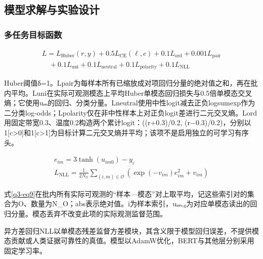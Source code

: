\hypertarget{q3-ux6a21ux578bux6c42ux89e3ux4e0eux5b9eux9a8cux8bbeux8ba1}{%
\subsection{模型求解与实验设计}\label{q3-ux6a21ux578bux6c42ux89e3ux4e0eux5b9eux9a8cux8bbeux8ba1}}

\hypertarget{q3-ux591aux4efbux52a1ux76eeux6807ux51fdux6570}{%
\subsubsection{多任务目标函数}\label{q3-ux591aux4efbux52a1ux76eeux6807ux51fdux6570}}

\begin{equation}
\begin{gathered}L=L_{\mathrm{Huber}}(r,y)+0.5L_{\mathrm{CE}}(\ell,c)+0.1L_{\mathrm{ord}}+0.001L_{\mathrm{pair}} \\ \quad+0.1L_{\mathrm{uni}}+0.1L_{\mathrm{neutral}}+0.1L_{\mathrm{polarity}}+0.1L_{\mathrm{NLL}}\end{gathered}\label{q3-eq8}
\end{equation}

Huber阈值δ=1。Lpair为每样本所有已缩放成对项回归分量的绝对值之和，再在批内平均。Luni在实际可观测模态上平均Huber单模态回归损失与0.5倍单模态交叉熵；它使用uₘ的回归、分类分量。Lneutral使用中性logit减去正负logsumexp作为二分类log-odds；Lpolarity仅在非中性样本上对正负logit差进行二元交叉熵。Lord用固定带宽0.3、温度0.2构造两个累计logit：((r+0.3)/0.2, (r−0.3)/0.2)，分别以1{[}c\textgreater0{]}和1{[}c\textgreater1{]}为目标计算二元交叉熵并平均；该项不是启用独立的可学习有序头。

\begin{equation}
\begin{gathered}e_{im}=3\tanh(u_{im0})-y_i \\ L_{\mathrm{NLL}}=\frac{1}{2N_{\mathcal O}}\sum_{(i,m)\in\mathcal O}(\exp(-v_{im})e_{im}^2+v_{im})\end{gathered}\label{q3-eq9}
\end{equation}

式\eqref{q3-eq9}在批内所有实际可观测的``样本---模态''对上取平均，记这些索引对的集合为O、数量为N\_O；abs表示绝对值。i为样本索引，uᵢₘ,₀为对应单模态读出的回归分量。模态丢弃不改变此项的实际观测监督范围。

异方差回归NLL\cite{q3-ref4}以单模态残差监督方差模块，其含义限于模型回归误差，不提供模态贡献或人类证据可靠性的真值。模型以AdamW优化，BERT与其他层分别采用固定学习率。

